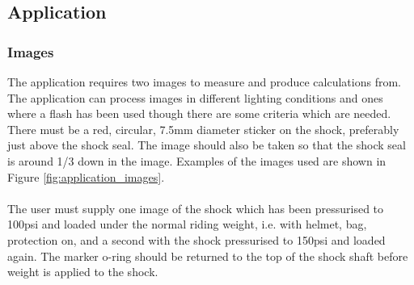 	\subsection{Application}
		\subsubsection{Images}
			The application requires two images to measure and produce calculations from. The application can process images in different lighting conditions and ones where a flash has been used though there are some criteria which are needed. There must be a red, circular, 7.5mm diameter sticker on the shock, preferably just above the shock seal. The image should also be taken so that the shock seal is around 1/3 down in the image. Examples of the images used are shown in Figure \ref{fig:application_images}.
			\\\\
			The user must supply one image of the shock which has been pressurised to 100psi and loaded under the normal riding weight, i.e. with helmet, bag, protection on, and a second with the shock pressurised to 150psi and loaded again. The marker o-ring should be returned to the top of the shock shaft before weight is applied to the shock.
